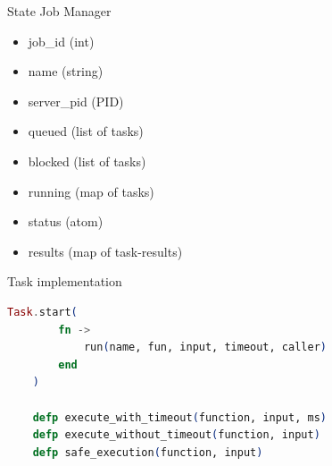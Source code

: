 \documentclass{beamer}
\begin{document}
\begin{frame}{State Job Manager}
    \begin{itemize}
        \item job\_id (int)
        \item name (string)
        \item server\_pid (PID)
        \item queued (list of tasks)
        \item blocked (list of tasks)
        \item running (map of tasks)
        \item status (atom)
        \item results (map of task-results)
    \end{itemize}
\end{frame}

\begin{frame}[fragile]{Task implementation}

\begin{lstlisting}[language=elixir]
    Task.start(
        fn -> 
            run(name, fun, input, timeout, caller) 
        end
    )

    defp execute_with_timeout(function, input, ms) 
    defp execute_without_timeout(function, input) 
    defp safe_execution(function, input)
\end{lstlisting}
   
\end{frame}
\end{document}
